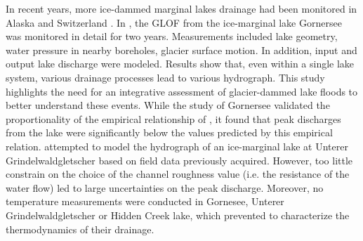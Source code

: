 In recent years, more ice-dammed marginal lakes drainage had been monitored in Alaska \citep[Hidden Creek Lake, ][]{Anderson&al2003,Anderson&al2005,Walder&al2005,Walder&al2006} and Switzerland \citep{Huss&al2007, Werder&al2010}. In \cite{Huss&al2007}, the GLOF from the ice-marginal lake Gornersee was monitored in detail for two years. Measurements included lake geometry, water pressure in nearby boreholes, glacier surface motion. In addition, input and output lake discharge were modeled. Results show that, even within a single lake system, various drainage processes lead to various hydrograph. This study highlights the need for an integrative assessment of glacier-dammed lake floods to better understand these events. While the study of Gornersee validated the proportionality of the empirical relationship of \cite{Clague&mathews1973}, it found that peak discharges from the lake were significantly below the values predicted by this empirical relation. \cite{Werder&al2010} attempted to model the hydrograph of an ice-marginal lake at Unterer Grindelwaldgletscher based on field data previously acquired. However, too little constrain on the choice of the channel roughness value (i.e. the resistance of the water flow) led to large uncertainties on the peak discharge. Moreover, no temperature measurements were conducted in Gornesee, Unterer Grindelwaldgletscher or Hidden Creek lake, which prevented to characterize the thermodynamics of their drainage.






